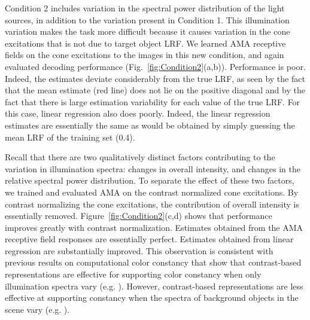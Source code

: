 \documentclass{jov}
\begin{document}
Condition 2 includes variation in the spectral power distribution of the light sources, in addition to the variation present in Condition 1. 
This illumination variation makes the task more difficult because it causes variation in the cone excitations that is not due to target object LRF. 
We learned AMA receptive fields on the cone excitations to the images in this new condition, and again evaluated decoding performance (Fig.~\ref{fig:Condition2}(a,b)). 
Performance is poor.
Indeed, the estimates deviate considerably from the true LRF, as seen by the fact that the mean estimate
(red line) does not lie on the positive diagonal and by the fact that there is large estimation variability for each
value of the true LRF.
For this case, linear regression also does poorly. Indeed, the linear regression estimates are essentially the same as would be obtained
by simply guessing the mean LRF of the training set (0.4).

Recall that there are two qualitatively distinct factors contributing to the variation in illumination spectra: changes in overall intensity, and changes in the relative spectral power distribution. 
To separate the effect of these two factors, we trained and evaluated AMA on the contrast normalized cone excitations. 
By contrast normalizing the cone excitations, the contribution of overall intensity is essentially removed.
Figure~\ref{fig:Condition2}(c,d) shows that performance improves greatly with contrast normalization. 
Estimates obtained from the AMA receptive field responses are essentially perfect. 
Estimates obtained from linear regression are substantially improved.
This observation is consistent with previous results on computational color constancy that show that 
contrast-based representations are effective for supporting color constancy when only illumination spectra vary (e.g. ).
However, contrast-based representations are less effective at supporting constancy when the spectra of background objects in the scene vary (e.g. ).
\end{document}
